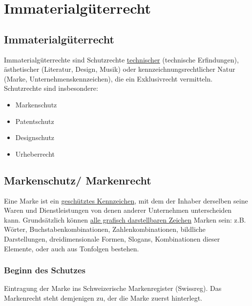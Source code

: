 \section{Immaterialgüterrecht}

\subsection{Immaterialgüterrecht}
Immaterialgüterrechte sind Schutzrechte \underline{technischer} (technische Erfindungen), ästhetischer (Literatur, Design, Musik) oder kennzeichnungsrechtlicher Natur (Marke, Unternehmenskennzeichen), die ein Exklusivrecht vermitteln.
Schutzrechte sind insbesondere:\\

\begin{minipage}{0.5\linewidth}
    \begin{itemize}
        \item Markenschutz
        \item Patentschutz
    \end{itemize}
\end{minipage}
\begin{minipage}{0.5\linewidth}
    \begin{itemize}
        \item Designschutz
        \item Urheberrecht
    \end{itemize}
\end{minipage}

\subsection{Markenschutz/ Markenrecht}
Eine Marke ist ein \underline{geschütztes Kennzeichen}, mit dem der Inhaber derselben seine Waren und Dienstleistungen von denen anderer Unternehmen unterscheiden kann. Grundsätzlich können \underline{alle grafisch darstellbaren Zeichen} Marken sein: z.B. Wörter, Buchstabenkombinationen, Zahlenkombinationen, bildliche Darstellungen, dreidimensionale Formen, Slogans, Kombinationen dieser Elemente, oder auch aus Tonfolgen bestehen.

\subsubsection{Beginn des Schutzes}
Eintragung der Marke ins Schweizerische Markenregister (Swissreg). Das Markenrecht steht demjenigen zu, der die Marke zuerst hinterlegt.

